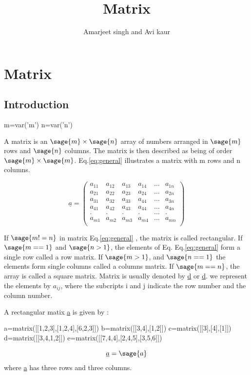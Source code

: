 \documentclass[12pt]{report}
\title{\textbf{Matrix}}
\author{Amarjeet singh and Avi kaur}
\newcommand{\lab}[1]{
Eq.\ref{#1}
}
\begin{document}
\begin{titlepage}
\maketitle
\end{titlepage}
\chapter{Matrix}
\section{Introduction}
\begin{sagesilent}
m=var('m')
n=var('n')
\end{sagesilent}

A matrix is an $\sage{m} \times \sage{n}$  array of numbers arranged in $\sage{m}$ rows and $\sage{n}$ columns. The matrix is then described as being of order $\sage{m} \times \sage{m}$. \lab{eq:general} illustrates a matrix with m rows and n columns.


\begin{equation}
\underline{a}=\left(\begin{array}{rrrrrr}
a_{11} & a_{12} & a_{13} & a_{14} & ... & a_{1n} \\
a_{21} & a_{22} & a_{23} & a_{24} & ... & a_{2n} \\
a_{31} & a_{32} & a_{33} & a_{44} & ... & a_{3n} \\
a_{41} & a_{42} & a_{43} & a_{44} & ... & a_{4n} \\
.     & .     & .     & .     & ... & .     \\
a_{m1} & a_{m2} & a_{m3} & a_{m4} & ... & a_{mn} \\
\end{array}\right) \label{eq:general}          
\end{equation}


If $\sage{m!=n}$ in matrix \lab{eq:general}, the matrix is called rectangular. If $\sage{m==1}$ and $\sage{n>1}$, the elements of Eq.\lab{eq:general} form a single row called a row matrix. If $\sage{m>1}$, and $\sage{n==1}$ the elements form single columns called a columns matrix. If $\sage{m==n}$, the array is called a square matrix.
Matrix is usually denoted by \underline{d} or \underline{d}.
we represent the elements by $a_{{ij}}$, where the subcripts i and j indicate the row number and the column number.

A rectangular matix \underline{a} is given by : 
\begin{sagesilent}
a=matrix([[1,2,3],[1,2,4],[6,2,3]])
b=matrix([[3,4],[1,2]])
c=matrix([[3],[4],[1]])
d=matrix([[3,4,1,2]])
e=matrix([[7,4,4],[2,4,5],[3,5,6]])
\end{sagesilent}
\begin{equation}
\underline{a}=\sage{a}
\label{eq:rectangle}
\end{equation}
where \underline{a} has three rows and three columns.
\end{document}
